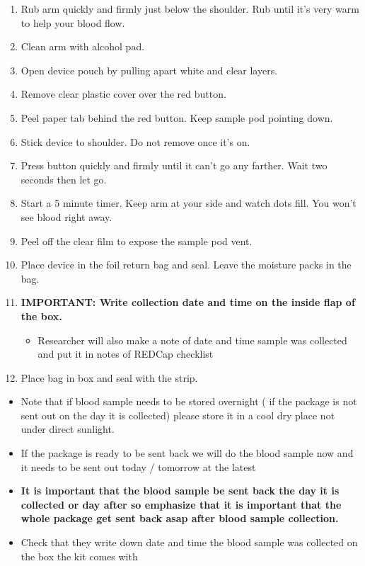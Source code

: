 \documentclass[
]{book}
\providecommand{\tightlist}{%
  \setlength{\itemsep}{0pt}\setlength{\parskip}{0pt}}
\begin{document}
\begin{enumerate}
\def\labelenumi{\arabic{enumi}.}
\item
  Rub arm quickly and firmly just below the shoulder. Rub until it's very warm to help your blood flow.
\item
  Clean arm with alcohol pad.
\item
  Open device pouch by pulling apart white and clear layers.
\item
  Remove clear plastic cover over the red button.
\item
  Peel paper tab behind the red button. Keep sample pod pointing down.
\item
  Stick device to shoulder. Do not remove once it's on.
\item
  Press button quickly and firmly until it can't go any farther. Wait two seconds then let go.
\item
  Start a 5 minute timer. Keep arm at your side and watch dots fill. You won't see blood right away.
\item
  Peel off the clear film to expose the sample pod vent.
\item
  Place device in the foil return bag and seal. Leave the moisture packs in the bag.
\item
  \textbf{IMPORTANT: Write collection date and time on the inside flap of the box.}

  \begin{itemize}
  \tightlist
  \item
    Researcher will also make a note of date and time sample was collected and put it in notes of REDCap checklist
  \end{itemize}
\item
  Place bag in box and seal with the strip.
\end{enumerate}

\begin{itemize}
\item
  Note that if blood sample needs to be stored overnight ( if the package is not sent out on the day it is collected) please store it in a cool dry place not under direct sunlight.
\item
  If the package is ready to be sent back we will do the blood sample now and it needs to be sent out today / tomorrow at the latest
\item
  \textbf{It is important that the blood sample be sent back the day it is collected or day after so emphasize that it is important that the whole package get sent back asap after blood sample collection.}
\item
  Check that they write down date and time the blood sample was collected on the box the kit comes with
\end{itemize}
\end{document}
